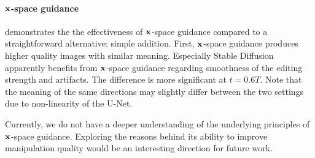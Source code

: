 \paragraph{$\mathbf{x}$-space guidance}
\label{appendixsec:ablation_x_guidance}
 demonstrates the the effectiveness of $\mathbf{x}$-space guidance compared to a straightforward alternative: simple addition. First, $\mathbf{x}$-space guidance produces higher quality images with similar meaning. Especially Stable Diffusion apparently benefits from $\mathbf{x}$-space guidance regarding smoothness of the editing strength and artifacts. The difference is more significant at $t=0.6T$. Note that the meaning of the same directions may slightly differ between the two settings due to non-linearity of the U-Net.

Currently, we do not have a deeper understanding of the underlying principles of $\mathbf{x}$-space guidance. Exploring the reasons behind its ability to improve manipulation quality would be an interesting direction for future work.




